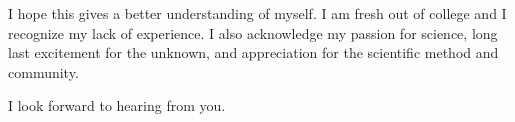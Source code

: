 \documentclass[11pt,a4paper,roman]{moderncv}
\begin{document}

I hope this gives a better understanding of myself. I am fresh out of college and I recognize my lack of experience. I also acknowledge my passion for science, long last excitement for the unknown, and appreciation for the scientific method and community.

I look forward to hearing from you. 

\vspace{0.5cm}

\makeletterclosing
\end{document}
